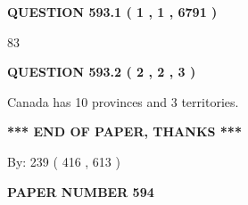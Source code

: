 \documentclass[12pt]{article}
\begin{document}
   
   
   
 \vspace{0.2in}
 
 
 
 
   
   
  
\vspace{0.2in}
  
{\textbf{\Large{QUESTION
593.1 
 ( 1 , 1 , 6791 )
}}}
  
  
 
 
\noindent{}

83
 
 
  
\vspace{0.2in}
  
{\textbf{\Large{QUESTION
593.2 
 ( 2 , 2 , 3 )
}}}
  
  
 
 
\noindent{}
 
 
Canada has 10  provinces and 3 territories.
 
 
 
 
   
   
 \vspace{0.2in}
 
   
   
   
   
\vspace{1.0in} 
{\textbf{\large{ *** END OF PAPER, THANKS *** }}} 
   
   
\hspace{1.0in} By: 
 239 ( 416 ,  613 )
   
   
   
   
\newpage 
\setcounter{page}{ 
   594001 } 
   
   
   
   
 {\textbf{ \Large{ PAPER NUMBER  594  }}}
   
   
\vspace{0.2in}
   
   
   
   
   
   
 \vspace{0.2in}
 
 
 
 
   
\end{document}

